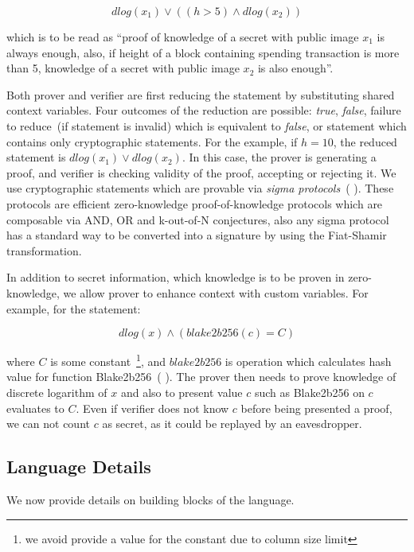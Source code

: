 \documentclass[11pt]{article}
\newcommand{\authnote}[2]{\marginpar{\parbox{\marginparwidth}{\tiny %
  \textsf{#1 {\textcolor{blue}{notes: #2}}}}}%
  \textcolor{blue}{\textbf{\dag}}}
\newcommand{\authnote}[2]{
  \textsf{#1 \textcolor{blue}{: #2}}}
\newcommand{\authnote}[2]{}
\newcommand{\knote}[1]{{\authnote{\textcolor{green}{kushti notes}}{#1}}}
\begin{document}
\begin{equation}
\label{eq:example1}
dlog(x_1) \lor ((h > 5) \land dlog(x_2))
\end{equation}

which is to be read as ``proof of knowledge of a secret with public image $x_1$ is always enough, also, if height of a block containing spending transaction is more than 5, knowledge of a secret with public image $x_2$ is also enough''.

Both prover and verifier are first reducing the statement by substituting shared context variables. Four outcomes of the reduction are possible: {\em true}, {\em false}, failure to reduce~(if statement is invalid) which is equivalent to {\em false}, or statement which contains only cryptographic statements. For the example, if $h = 10$, the reduced statement is $dlog(x_1) \lor dlog(x_2)$. In this case, the prover is generating a proof, and verifier is checking validity of the proof, accepting or rejecting it. We use cryptographic statements which are provable via {\em sigma protocols}~(\knote{links}). These protocols are efficient zero-knowledge \knote{special honest verifier ZK actually} proof-of-knowledge protocols which are composable via AND, OR and k-out-of-N conjectures, also any sigma protocol has a standard way to be converted into a signature by using the Fiat-Shamir transformation. 

In addition to secret information, which knowledge is to be proven in zero-knowledge, we allow prover to enhance context with custom variables. For example, for the statement:

$$dlog(x) \land (blake2b256(c) = C)$$

where $C$ is some constant~\footnote{we avoid provide a value for the constant due to column size limit}, and $blake2b256$ is operation which calculates hash value for function Blake2b256~(\knote{link}). The prover then needs to prove knowledge of discrete logarithm of $x$ and also to present value $c$ such as Blake2b256 on $c$ evaluates to $C$. Even if verifier does not know $c$ before being presented a proof, we can not count $c$ as secret, as it could be replayed by an eavesdropper.   



\subsection{Language Details} 
\knote{better subsection name}

We now provide details on building blocks of the language.  
\end{document}
